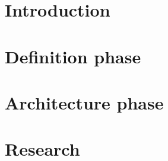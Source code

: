 \documentclass{report}
\begin{document}




\tableofcontents
\newpage

\chapter{Introduction}

\newpage

\chapter{Definition phase}



\chapter{Architecture phase}


\newpage
\chapter{Research}

\newpage
\printbibliography

\newpage
\end{document}
